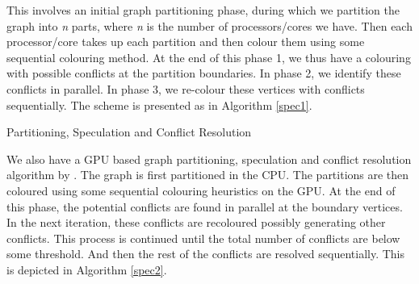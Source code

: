 \documentclass[MTech]{iitmdiss}
\makeatletter
\def\BState{\State\hskip-\ALG@thistlm}
\makeatother
\begin{document}
This involves an initial graph partitioning phase, during which we partition the graph into \textit{n} parts, where \textit{n} is the number of processors/cores we have. Then each processor/core takes up each partition and then colour them using some sequential colouring method. At the end of this phase 1, we thus have a colouring with possible conflicts at the partition boundaries. In phase 2, we identify these conflicts in parallel. In phase 3, we re-colour these vertices with conflicts sequentially. The scheme is presented as in Algorithm \ref{spec1}.

\begin{algorithm}
\caption{Partitioning, Speculation and Conflict Resolution}\label{spec1}
\end{algorithm}

We also have a GPU based graph partitioning, speculation and conflict resolution algorithm by \citet{Grosset:2011:EGC:2038037.1941597}. The graph is first partitioned in the CPU. The partitions are then coloured using some sequential colouring heuristics on the GPU. At the end of this phase, the potential conflicts are found in parallel at the boundary vertices. In the next iteration, these conflicts are recoloured possibly generating other conflicts. This process is continued until the total number of conflicts are below some threshold. And then the rest of the conflicts are resolved sequentially. This is depicted in Algorithm \ref{spec2}.
\end{document}
